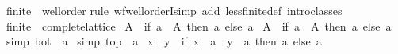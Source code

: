\begin{isabellebody}
\isamarkupfalse%
%
\endisatagproof
{\isafoldproof}%
%
\isadelimproof
\isanewline
%
\endisadelimproof
\isanewline
{}\isamarkupfalse%
\isanewline
\isanewline
{}\isamarkupfalse%
\ finite{\isacharunderscore}{\kern0pt}{}\ {\isacharcolon}{\kern0pt}{\isacharcolon}{\kern0pt}\ wellorder\isanewline
%
\isadelimproof
%
\endisadelimproof
%
\isatagproof
{}\isamarkupfalse%
{\isacharparenleft}{\kern0pt}rule\ wf{\isacharunderscore}{\kern0pt}wellorderI{\isacharparenright}{\kern0pt}{\isacharparenleft}{\kern0pt}simp\ add{\isacharcolon}{\kern0pt}\ less{\isacharunderscore}{\kern0pt}finite{\isacharunderscore}{\kern0pt}{}{\isacharunderscore}{\kern0pt}def{\isacharcomma}{\kern0pt}\ intro{\isacharunderscore}{\kern0pt}classes{\isacharparenright}{\kern0pt}%
\endisatagproof
{\isafoldproof}%
%
\isadelimproof
\isanewline
%
\endisadelimproof
\isanewline
{}\isamarkupfalse%
\ finite{\isacharunderscore}{\kern0pt}{}\ {\isacharcolon}{\kern0pt}{\isacharcolon}{\kern0pt}\ complete{\isacharunderscore}{\kern0pt}lattice\isanewline
{}\isanewline
\isanewline
{}\isamarkupfalse%
\ {\isachardoublequoteopen}{\isasymSqinter}A\ {\isacharequal}{\kern0pt}\ {\isacharparenleft}{\kern0pt}if\ a\ {\isasymin}\ A\ then\ a\ else\ a\isanewline
{}\isamarkupfalse%
\ {\isachardoublequoteopen}{\isasymSqunion}A\ {\isacharequal}{\kern0pt}\ {\isacharparenleft}{\kern0pt}if\ a\ {\isasymin}\ A\ then\ a\ else\ a\isanewline
{}\isamarkupfalse%
\ {\isacharbrackleft}{\kern0pt}simp{\isacharbrackright}{\kern0pt}{\isacharcolon}{\kern0pt}\ {\isachardoublequoteopen}bot\ {\isacharequal}{\kern0pt}\ a\isanewline
{}\isamarkupfalse%
\ {\isacharbrackleft}{\kern0pt}simp{\isacharbrackright}{\kern0pt}{\isacharcolon}{\kern0pt}\ {\isachardoublequoteopen}top\ {\isacharequal}{\kern0pt}\ a\isanewline
{}\isamarkupfalse%
\ {\isachardoublequoteopen}x\ {\isasymsqinter}\ y\ {\isacharequal}{\kern0pt}\ {\isacharparenleft}{\kern0pt}if\ x\ {\isacharequal}{\kern0pt}\ a\ {\isasymor}\ y\ {\isacharequal}{\kern0pt}\ a\ then\ a\ else\ a\isanewline

\end{isabellebody}

